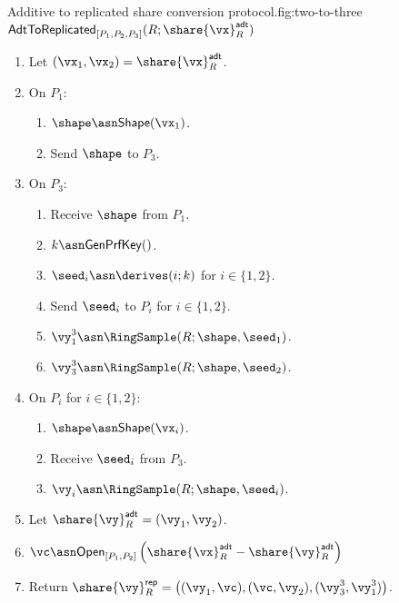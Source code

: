 
\begin{Boxfig}{Additive to replicated share conversion protocol.}{fig:two-to-three}{$\mathsf{AdtToReplicated}_{[P_1, P_2, P_3]}(R; \share{\vx}^{\mathsf{adt}}_{R})$}
\begin{enumerate}
\item Let $(\vx_1, \vx_2) = \share{\vx}^{\mathsf{adt}}_{R}$.

\item On $P_1$:
\begin{enumerate}
  \item $\shape \asn \mathsf{Shape}(\vx_1)$.
  \item Send $\shape$ to $P_3$.
\end{enumerate}

\item On $P_3$:
\begin{enumerate}
  \item Receive $\shape$ from $P_1$.
  \item $k \asn \mathsf{GenPrfKey}()$.
  \item $\seed_i \asn \derives(i; k)$ for $i \in \{1, 2\}$.
  \item Send $\seed_i$ to $P_i$ for $i \in \{1, 2\}$.
  \item $\vy_1^3 \asn \RingSample(R; \shape, \seed_1)$.
  \item $\vy_3^3 \asn \RingSample(R; \shape, \seed_2)$.
\end{enumerate}

\item On $P_i$ for $i \in \{1,2\}$:
\begin{enumerate}
  \item $\shape \asn \mathsf{Shape}(\vx_i)$.
  \item Receive $\seed_i$ from $P_3$.
  \item $\vy_i \asn \RingSample(R; \shape, \seed_i)$.
\end{enumerate}

\item Let $\share{\vy}^{\mathsf{adt}}_{R} = (\vy_1, \vy_2)$.

\item $\vc \asn \mathsf{Open}_{[P_1, P_2]}\left( \share{\vx}^{\mathsf{adt}}_{R} - \share{\vy}^{\mathsf{adt}}_{R} \right)$

\item Return $\share{\vy}^{\mathsf{rep}}_{R} = \left( (\vy_1, \vc), (\vc, \vy_2), (\vy_3^3, \vy_1^3) \right)$.
\end{enumerate}
\end{Boxfig}

